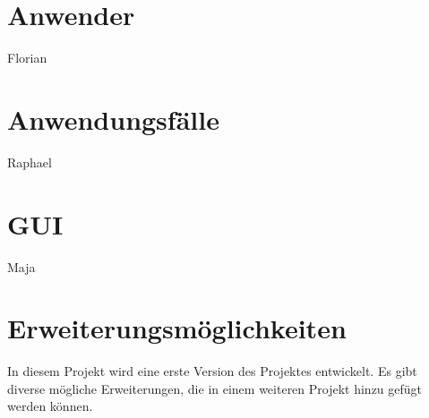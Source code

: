 \documentclass[11pt]{article}
\begin{document}
\section{Anwender}
Florian

\section{Anwendungsfälle}
Raphael

\section{GUI}
Maja

\section{Erweiterungsmöglichkeiten}
In diesem Projekt wird eine erste Version des Projektes entwickelt. Es gibt diverse mögliche Erweiterungen, die in einem weiteren Projekt hinzu gefügt werden können. 
\end{document}
